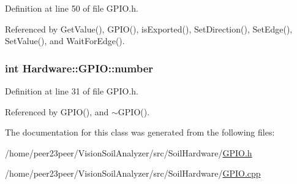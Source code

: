 Definition at line 50 of file G\+P\+I\+O.\+h.



Referenced by Get\+Value(), G\+P\+I\+O(), is\+Exported(), Set\+Direction(), Set\+Edge(), Set\+Value(), and Wait\+For\+Edge().

\hypertarget{class_hardware_1_1_g_p_i_o_a1671a87bb70911b0a6a29019a068cf96}{}
\subsubsection[{number}]{\setlength{\rightskip}{0pt plus 5cm}int Hardware\+::\+G\+P\+I\+O\+::number}\label{class_hardware_1_1_g_p_i_o_a1671a87bb70911b0a6a29019a068cf96}


Definition at line 31 of file G\+P\+I\+O.\+h.



Referenced by G\+P\+I\+O(), and $\sim$\+G\+P\+I\+O().



The documentation for this class was generated from the following files\+:\begin{DoxyCompactItemize}
\item 
/home/peer23peer/\+Vision\+Soil\+Analyzer/src/\+Soil\+Hardware/\hyperlink{_g_p_i_o_8h}{G\+P\+I\+O.\+h}\item 
/home/peer23peer/\+Vision\+Soil\+Analyzer/src/\+Soil\+Hardware/\hyperlink{_g_p_i_o_8cpp}{G\+P\+I\+O.\+cpp}\end{DoxyCompactItemize}
